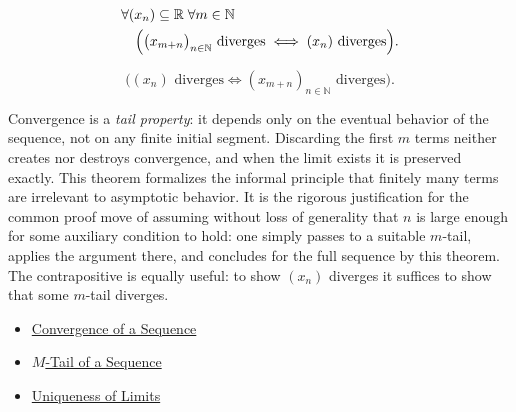 \begin{remark*}[Interpretation]
\[
\begin{aligned}
&\forall (x_n) \subseteq \mathbb{R} \;\forall m \in \mathbb{N}\\
&\quad\Bigl(
    \bigl(x_{m+n}\bigr)_{n \in \mathbb{N}} \text{ diverges}
    \;\Longleftrightarrow\;
    (x_n) \text{ diverges}
\Bigr).
\end{aligned}
\]


\[
\bigl((x_n)\text{ diverges}\Longleftrightarrow (x_{m+n})_{n\in\mathbb{N}}\text{ diverges}\bigr).
\]


Convergence is a \emph{tail property}: it depends only on the
eventual behavior of the sequence, not on any finite initial
segment. Discarding the first $m$ terms neither creates nor
destroys convergence, and when the limit exists it is preserved
exactly. This theorem formalizes the informal principle that
finitely many terms are irrelevant to asymptotic behavior. It is
the rigorous justification for the common proof move of assuming
without loss of generality that $n$ is large enough for some
auxiliary condition to hold: one simply passes to a suitable
$m$-tail, applies the argument there, and concludes for the full
sequence by this theorem. The contrapositive is equally useful:
to show $(x_n)$ diverges it suffices to show that some $m$-tail
diverges.
\end{remark*}

\begin{dependencies}
\begin{itemize}
  \item \hyperref[def:convergent-sequence]{Convergence of a Sequence}
  \item \hyperref[def:m-tail]{$M$-Tail of a Sequence}
  \item \hyperref[thm:uniqueness-of-limits]{Uniqueness of Limits}
\end{itemize}
\end{dependencies}









